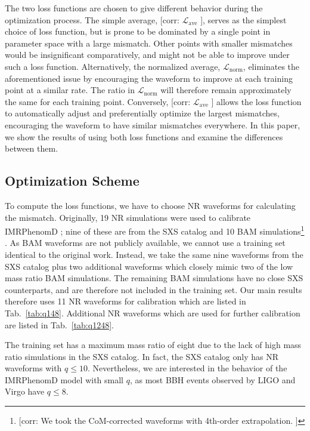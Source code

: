 \documentclass[twocolumn]{aastex631}
\newcommand{\corr}[1]{{\color{red}[corr: #1 ]}}
\begin{document}
The two loss functions are chosen to give different 
behavior during the optimization process.
The simple average, \corr{$\mathcal{L}_{\mathrm{ave}}$}, serves as the simplest choice of loss function,
but is prone to be dominated by a single point in parameter space with a large mismatch.
Other points with smaller mismatches would be insignificant comparatively, and might not be able 
to improve under such a loss function.
Alternatively, the normalized average, $\mathcal{L}_{\mathrm{norm}}$, eliminates the aforementioned issue
by encouraging the waveform to improve at each training point at a similar rate.
The ratio in $\mathcal{L}_{\mathrm{norm}}$ will therefore remain approximately the same for each training point.
Conversely, \corr{$\mathcal{L}_{\mathrm{ave}}$} allows the loss function to automatically adjust
and preferentially optimize the largest mismatches, encouraging the waveform to have similar mismatches everywhere.
In this paper, we show the results of using both loss functions 
and examine the differences between them. 

\subsection{Optimization Scheme} \label{subsec:optimization}

To compute the loss functions, we have to choose NR waveforms for calculating the mismatch.
Originally, 19 NR simulations were used to calibrate IMRPhenomD \citep{khan2016frequency}; nine of these 
are from the SXS catalog 
\citep{boyle2019sxs} and 10 BAM simulations\footnote{\corr{We took the CoM-corrected waveforms with 4th-order extrapolation.}} . 
As BAM waveforms are not publicly available, we cannot use a training set identical to the original work.
Instead, we take the same nine waveforms from the SXS catalog plus two additional waveforms which closely mimic
two of the low mass ratio BAM simulations. 
The remaining BAM simulations have no close SXS counterparts, and are therefore not included in the training set.
Our main results therefore uses 11 NR waveforms for calibration which are listed in Tab.~\ref{tab:q148}.
Additional NR waveforms which are used for further calibration are listed in Tab.~\ref{tab:q1248}.  

The training set has a maximum mass ratio of eight due to the lack 
of high mass ratio simulations in the SXS catalog.
In fact, the SXS catalog only has NR waveforms with $q\leq10$.
Nevertheless, we are interested in the behavior of the IMRPhenomD model with small $q$,
as most BBH events observed by LIGO and Virgo have $q\leq8$.
\end{document}
